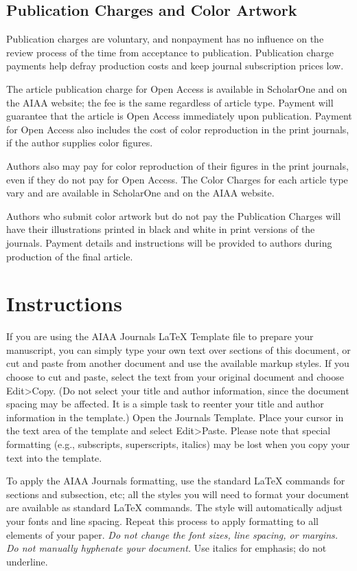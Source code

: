 \documentclass[journal]{new-aiaa}
\begin{document}
\subsection{Publication Charges and Color Artwork}

Publication charges are voluntary, and nonpayment has no influence on the review process of the time from acceptance to publication. Publication charge payments help defray production costs and keep journal subscription prices low. 

The article publication charge for Open Access is available in ScholarOne and on the AIAA website; the fee is the same regardless of article type. Payment will guarantee that the article is Open Access immediately upon publication. Payment for Open Access also includes the cost of color reproduction in the print journals, if the author supplies color figures.

Authors also may pay for color reproduction of their figures in the print journals, even if they do not pay for Open Access. The Color Charges for each article type vary and are available in ScholarOne and on the AIAA website.

Authors who submit color artwork but do not pay the Publication Charges will have their illustrations printed in black and white in print versions of the journals. Payment details and instructions will be provided to authors during production of the final article. 

\section{Instructions}

If you are using the AIAA Journals \LaTeX{} Template file to prepare your manuscript, you can simply type your own text over sections of this document, or cut and paste from another document and use the available markup styles. If you choose to cut and paste, select the text from your original document and choose Edit>Copy. (Do not select your title and author information, since the document spacing may be affected. It is a simple task to reenter your title and author information in the template.) Open the Journals Template. Place your cursor in the text area of the template and select Edit>Paste. Please note that special formatting (e.g., subscripts, superscripts, italics) may be lost when you copy your text into the template.

To apply the AIAA Journals formatting, use the standard \LaTeX{} commands for sections and subsection, etc; all the styles you will need to format your document are available as standard \LaTeX{} commands. The style will automatically adjust your fonts and line spacing. Repeat this process to apply formatting to all elements of your paper. \emph{Do not change the font sizes, line spacing, or margins. Do not manually hyphenate your document.} Use italics for emphasis; do not underline. 
\end{document}
